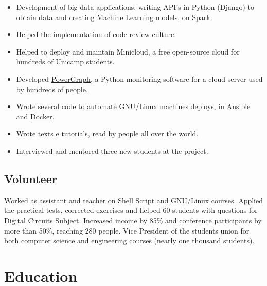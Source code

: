 \documentclass[10pt, a4paper, roman]{moderncv} %
\begin{document}
{
    \begin{itemize}
        \item Development of big data applications, writing API's in Python (Django) to obtain data and creating Machine Learning models, on Spark. 
        \item Helped the implementation of code review culture.
    \end{itemize}
}
{
    \begin{itemize}
        \item Helped to deploy and maintain Minicloud, a free open-source cloud for hundreds of Unicamp students.
        \item Developed \href{https://github.com/Guilhermeslucas/powergraph}{PowerGraph}, a Python monitoring software for a cloud server used by hundreds of people.
        \item Wrote several code to automate GNU/Linux machines deploys, in \href{https://github.com/Guilhermeslucas/Ansible-Code}{Ansible} and 
            \href{https://github.com/Guilhermeslucas/Dockerfiles}{Docker}.
        \item Wrote \href{http://openpower.ic.unicamp.br/blog/}{texts e tutorials}, read by people all over the world.
        \item Interviewed and mentored three new students at the project.
    \end{itemize}
}
\subsection{Volunteer}
{
    Worked as assistant and teacher on Shell Script and GNU/Linux courses.
}
{
    Applied the practical tests, corrected exercises and helped 60 students with questions for Digital Circuits Subject.
}
{
    Increased income by 85\% and conference participants by more than 50\%, reaching 280 people.
}
{
    Vice President of the students union for both computer science and engineering courses (nearly one thousand students).
}
\section{Education}
\end{document}
